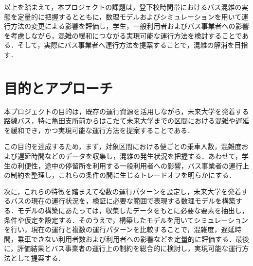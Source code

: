 以上を踏まえて，本プロジェクトの課題は，登下校時間帯におけるバス混雑の実態を定量的に把握するとともに，数理モデルおよびシミュレーションを用いて運行方法の変更による影響を評価し，学生，一般利用者およびバス事業者への影響を考慮しながら，混雑の緩和につながる実現可能な運行方法を検討することである．そして，実際にバス事業者へ運行方法を提案することで，混雑の解消を目指す．

\section{目的とアプローチ}
本プロジェクトの目的は，既存の運行資源を活用しながら，未来大学を発着する路線バス，特に亀田支所前からはこだて未来大学までの区間における混雑や遅延を緩和でき，かつ実現可能な運行方法を提案することである．

この目的を達成するため，まず，対象区間における便ごとの乗車人数，混雑度および遅延時間などのデータを収集し，混雑の発生状況を把握する．あわせて，学生の利便性，途中の停留所を利用する一般利用者への影響，バス事業者の運行上の制約を整理し，これらの条件の間に生じるトレードオフを明らかにする．

次に，これらの特徴を踏まえて複数の運行パターンを設定し，未来大学を発着するバスの現在の運行状況を，検証に必要な範囲で表現する数理モデルを構築する．モデルの構築にあたっては，収集したデータをもとに必要な要素を抽出し，条件や仮定を設定する．そのうえで，構築したモデルを用いてシミュレーションを行い，現在の運行と複数の運行パターンを比較することで，混雑度，遅延時間，乗車できない利用者数および利用者への影響などを定量的に評価する．最後に，評価結果とバス事業者の運行上の制約を総合的に検討し，実現可能な運行方法として提案する．
